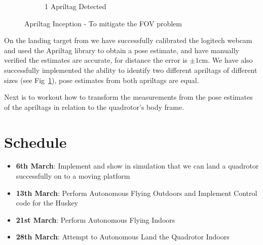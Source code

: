\documentclass{article}[12pt]
\begin{document}
\begin{figure}[H]
\begin{subfigure}[b]{0.45\linewidth}
		\caption{1 Apriltag Detected }
	\end{subfigure}
	\caption{Apriltag Inception - To mitigate the FOV problem}
	\label{fig:apriltag}
\end{figure}

On the landing target from we have successfully calibrated the logitech webcam 
and used the Apriltag library to obtain a pose estimate, and have manually 
verified the estimates are accurate, for distance the error is $\pm 1$cm. We 
have also successfully implemented the ability to identify two different 
apriltags of different sizes (see Fig~\ref{fig:apriltag}), pose estimates from 
both apriltags are equal.

Next is to workout how to transform the measurements from the pose estimates of 
the apriltags in relation to the quadrotor's body frame.



\section*{Schedule}

\begin{itemize}
	\vspace{-0.2cm}
	\setlength{\itemsep}{5pt}
	\setlength{\parskip}{0pt}
	\setlength{\parsep}{0pt}
	
	\item{\textbf{6th March}: Implement and show in simulation that we can land 
	a quadrotor successfully on to a moving platform}
	\item{\textbf{13th March}: Perform Autonomous Flying Outdoors and Implement 
	Control code for the Huskey}
	\item{\textbf{21st March}: Perform Autonomous Flying Indoors}
	\item{\textbf{28th March}: Attempt to Autonomous Land the Quadrotor Indoors}
\end{itemize}






{}

\end{document}
